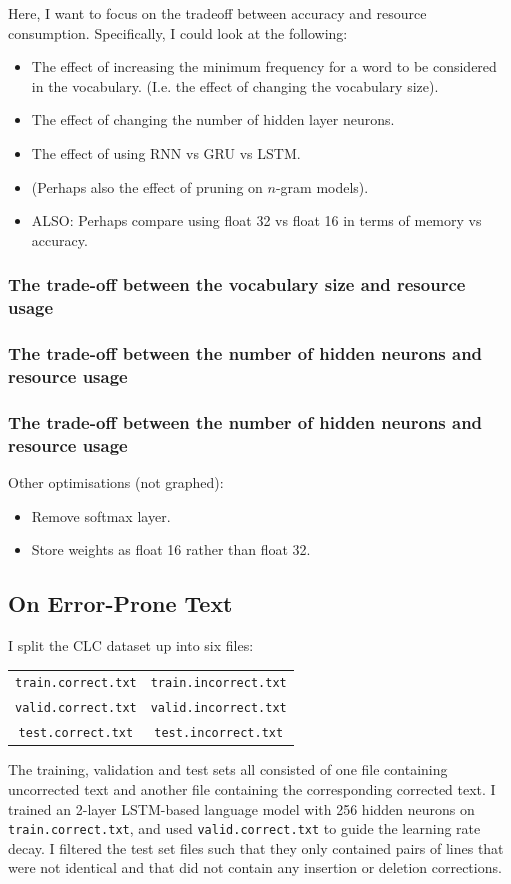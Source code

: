 \documentclass[a4paper, 12pt]{report}
\newcommand{\ttt}[1]{\texttt{#1}}
\begin{document}
Here, I want to focus on the tradeoff between accuracy and resource consumption. Specifically, I could look at the following: \\
\begin{itemize}
\item
	The effect of increasing the minimum frequency for a word to be considered in the vocabulary. (I.e. the effect of changing the vocabulary size).
\item
	The effect of changing the number of hidden layer neurons.
\item
	The effect of using RNN vs GRU vs LSTM.
\item
	(Perhaps also the effect of pruning on $n$-gram models).
\item
	ALSO: Perhaps compare using float 32 vs float 16 in terms of memory vs accuracy.
\end{itemize}
\subsubsection*{The trade-off between the vocabulary size and resource usage}
\subsubsection*{The trade-off between the number of hidden neurons and resource usage}
\subsubsection*{The trade-off between the number of hidden neurons and resource usage}

Other optimisations (not graphed):
\begin{itemize}
\item
	Remove softmax layer.
\item
	Store weights as float 16 rather than float 32.
\end{itemize}

\subsection{On Error-Prone Text}

I split the CLC dataset up into six files:
\begin{center}
\begin{tabular}{c c}
	\ttt{train.correct.txt} & \ttt{train.incorrect.txt} \\
	\ttt{valid.correct.txt} & \ttt{valid.incorrect.txt} \\
	\ttt{test.correct.txt} & \ttt{test.incorrect.txt}
\end{tabular}
\end{center}
The training, validation and test sets all consisted of one file containing uncorrected text and another file containing the corresponding corrected text. I trained an 2-layer LSTM-based language model with 256 hidden neurons on \ttt{train.correct.txt}, and used \ttt{valid.correct.txt} to guide the learning rate decay. I filtered the test set files such that they only contained pairs of lines that were not identical and that did not contain any insertion or deletion corrections. \\
\end{document}
